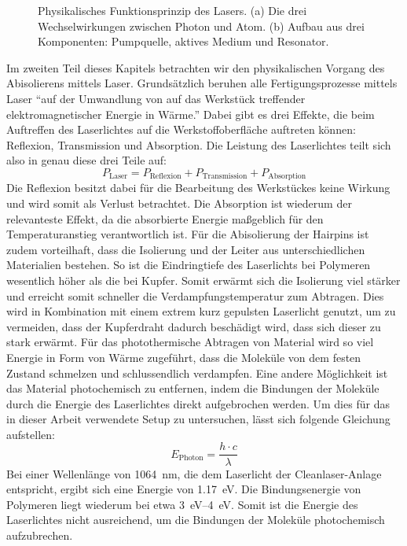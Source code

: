 \begin{figure}[htbp]
{}
  \caption[Physikalisches Funktionsprinzip des Lasers]%
          {Physikalisches Funktionsprinzip des Lasers. (a) Die drei
           Wechselwirkungen zwischen Photon und Atom. (b) Aufbau aus drei Komponenten:
           Pumpquelle, aktives Medium und Resonator.}
  \label{fig:laser-prinzip}
\end{figure}
%

Im zweiten Teil dieses Kapitels betrachten wir den physikalischen Vorgang des Abisolierens mittels Laser. Grundsätzlich beruhen alle
Fertigungsprozesse mittels Laser \enquote{auf der Umwandlung von auf das Werkstück treffender elektromagnetischer Energie in Wärme.}
Dabei gibt es drei Effekte, die beim Auftreffen des Laserlichtes auf die Werkstoffoberfläche auftreten können: Reflexion, Transmission
und Absorption. Die Leistung des Laserlichtes teilt sich also in genau diese drei Teile auf:
\begin{equation}
  P_\mathrm{Laser} = P_\mathrm{Reflexion} + P_\mathrm{Transmission}
                   + P_\mathrm{Absorption}
  \label{eq:laserleistung}
\end{equation}
Die Reflexion besitzt dabei für die Bearbeitung des Werkstückes keine Wirkung und wird somit als Verlust betrachtet. Die Absorption ist
wiederum der relevanteste Effekt, da die absorbierte Energie maßgeblich für den Temperaturanstieg verantwortlich ist. Für die Abisolierung
der Hairpins ist zudem vorteilhaft, dass die Isolierung und der Leiter aus unterschiedlichen Materialien bestehen. So ist die Eindringtiefe
des Laserlichts bei Polymeren wesentlich höher als die bei Kupfer. Somit erwärmt sich die Isolierung viel stärker und erreicht somit schneller
die Verdampfungstemperatur zum Abtragen. Dies wird in Kombination mit einem extrem kurz gepulsten Laserlicht genutzt, um zu vermeiden, dass der
Kupferdraht dadurch beschädigt wird, dass sich dieser zu stark erwärmt. Für das photothermische Abtragen von Material wird so viel Energie
in Form von Wärme zugeführt, dass die Moleküle von dem festen Zustand schmelzen und schlussendlich verdampfen. Eine andere Möglichkeit ist das
Material photochemisch zu entfernen, indem die Bindungen der Moleküle durch die Energie des Laserlichtes direkt aufgebrochen werden. Um dies für
das in dieser Arbeit verwendete Setup zu untersuchen, lässt sich folgende Gleichung aufstellen:
\begin{equation}
  E_\mathrm{Photon} = \frac{h \cdot c}{\lambda}
  \label{eq:photonenenergie}
\end{equation}
Bei einer Wellenlänge von \qty{1064}{\nano\metre}, die dem Laserlicht der Cleanlaser-Anlage entspricht, ergibt sich eine Energie von \qty{1,17}{\electronvolt}. Die Bindungsenergie von Polymeren liegt wiederum
bei etwa \qtyrange{3}{4}{\electronvolt}. Somit ist die Energie des Laserlichtes nicht ausreichend, um die Bindungen der Moleküle photochemisch aufzubrechen. 

